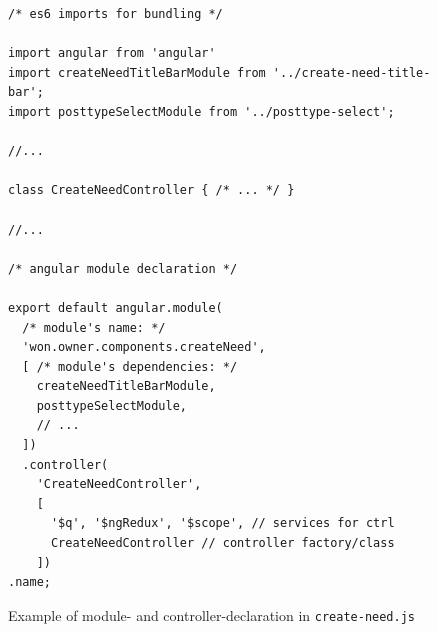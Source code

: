 \begin{figure}
\centering
\begin{verbatim}
/* es6 imports for bundling */

import angular from 'angular'
import createNeedTitleBarModule from '../create-need-title-bar';
import posttypeSelectModule from '../posttype-select';

//...

class CreateNeedController { /* ... */ }

//...

/* angular module declaration */

export default angular.module(
  /* module's name: */
  'won.owner.components.createNeed', 
  [ /* module's dependencies: */
    createNeedTitleBarModule,
    posttypeSelectModule,
    // ...
  ])
  .controller(
    'CreateNeedController', 
    [
      '$q', '$ngRedux', '$scope', // services for ctrl
      CreateNeedController // controller factory/class
    ])
.name;
\end{verbatim}
\caption{Example of module- and controller-declaration in \texttt{create-need.js}}
\label{fig:ng-duplicate-dependencies}
\end{figure}


